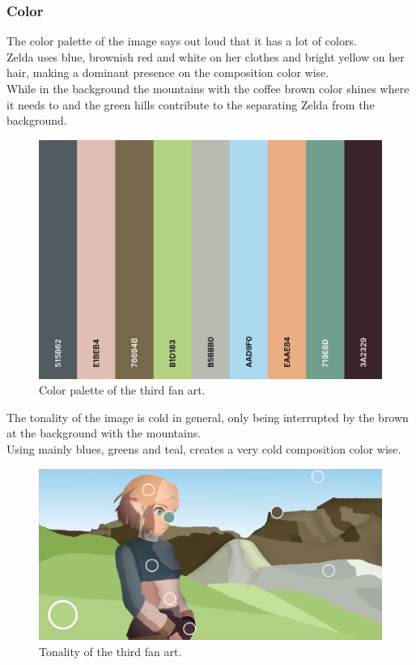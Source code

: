 \documentclass{cup-pan}
\begin{document}
        \subsubsection{Color}
            
            The color palette of the image says out loud that it has a lot of colors.\\
            Zelda uses blue, brownish red and white on her clothes and bright yellow on her hair, making a dominant presence on the composition color wise.\\
            While in the background the mountains with the coffee brown color shines where it needs to and the green hills contribute to the separating Zelda from the background. \\
            \begin{figure}[H]
                \includegraphics[width=\textwidth]{Fanart3/0_Analisi/paleta.png}
                \caption{Color palette of the third fan art.}
            \end{figure}

            The tonality of the image is cold in general, only being interrupted by the brown at the background with the mountains.\\
            Using mainly blues, greens and teal, creates a very cold composition color wise. 
            \begin{figure}[H]
                \includegraphics[width=\textwidth]{Fanart3/0_Analisi/tonality.png}
                \caption{Tonality of the third fan art.}
            \end{figure}
\end{document}
